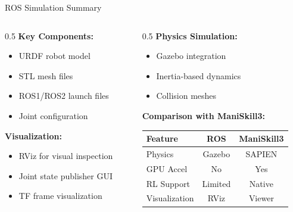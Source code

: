 \begin{frame}{ROS Simulation Summary}
\begin{columns}
\begin{column}{0.5\textwidth}
    \textbf{Key Components:}
    \begin{itemize}
        \item URDF robot model
        \item STL mesh files
        \item ROS1/ROS2 launch files
        \item Joint configuration
    \end{itemize}

    \vspace{0.3cm}

    \textbf{Visualization:}
    \begin{itemize}
        \item RViz for visual inspection
        \item Joint state publisher GUI
        \item TF frame visualization
    \end{itemize}
\end{column}
\begin{column}{0.5\textwidth}
    \textbf{Physics Simulation:}
    \begin{itemize}
        \item Gazebo integration
        \item Inertia-based dynamics
        \item Collision meshes
    \end{itemize}

    \vspace{0.3cm}

    \textbf{Comparison with ManiSkill3:}
    \begin{table}
    \centering
    \footnotesize
    \begin{tabular}{lcc}
    \toprule
    \textbf{Feature} & \textbf{ROS} & \textbf{ManiSkill3} \\
    \midrule
    Physics & Gazebo & SAPIEN \\
    GPU Accel & No & Yes \\
    RL Support & Limited & Native \\
    Visualization & RViz & Viewer \\
    \bottomrule
    \end{tabular}
    \end{table}
\end{column}
\end{columns}
\end{frame}

